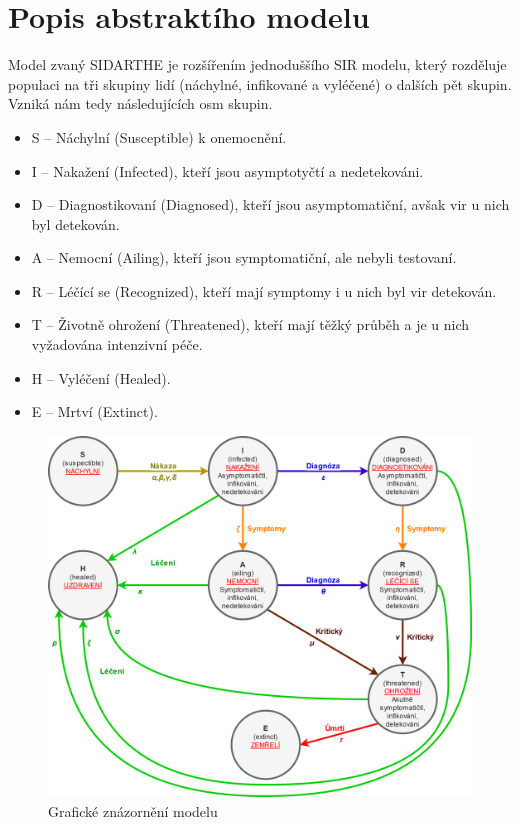 \documentclass[a4paper,11pt]{article}
\begin{document}
	\section{Popis abstraktího modelu}
		Model zvaný SIDARTHE je rozšířením jednoduššího SIR modelu, který rozděluje populaci na tři skupiny lidí (náchylné, infikované a vyléčené) o dalších pět skupin. Vzniká nám tedy následujících osm skupin.
		
		\begin{itemize}
			\item S -- Náchylní (Susceptible) k onemocnění.
			\item I -- Nakažení (Infected), kteří jsou asymptotyčtí a nedetekováni.
			\item D -- Diagnostikovaní (Diagnosed), kteří jsou asymptomatiční, avšak vir u nich byl detekován.
			\item A -- Nemocní (Ailing), kteří jsou symptomatiční, ale nebyli testovaní.
			\item R -- Léčící se (Recognized), kteří mají symptomy i u nich byl vir detekován.
			\item T -- Životně ohrožení (Threatened), kteří mají těžký průběh a je u nich vyžadována intenzivní péče.
			\item H -- Vyléčení (Healed).
			\item E -- Mrtví (Extinct).
		\end{itemize}
	
		\begin{figure}[h]
			\caption{Grafické znázornění modelu}
			\label{fig1}
			\centering
			\includegraphics[scale=0.25]{model.png}
		\end{figure}
		\newpage
	
\end{document}
